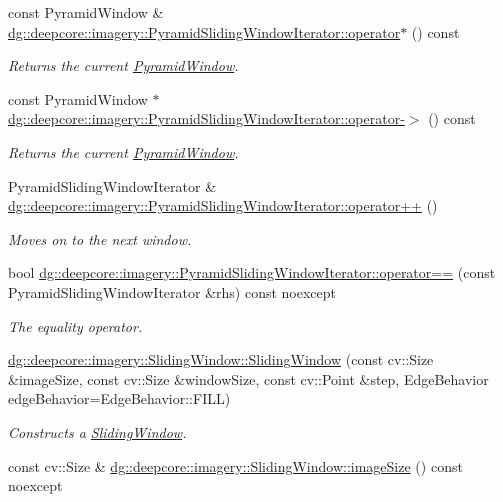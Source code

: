 \begin{DoxyCompactItemize}
const Pyramid\+Window \& \hyperlink{group___imagery_module_gaca9c2f2b709dbe324355c544933339ee}{dg\+::deepcore\+::imagery\+::\+Pyramid\+Sliding\+Window\+Iterator\+::operator$\ast$} () const 
\begin{DoxyCompactList}\small\item\em Returns the current \hyperlink{structdg_1_1deepcore_1_1imagery_1_1_pyramid_window}{Pyramid\+Window}. \end{DoxyCompactList}\item 
const Pyramid\+Window $\ast$ \hyperlink{group___imagery_module_gac54e72b4aa8c5b92bc491c12aed242d0}{dg\+::deepcore\+::imagery\+::\+Pyramid\+Sliding\+Window\+Iterator\+::operator-\/$>$} () const 
\begin{DoxyCompactList}\small\item\em Returns the current \hyperlink{structdg_1_1deepcore_1_1imagery_1_1_pyramid_window}{Pyramid\+Window}. \end{DoxyCompactList}\item 
Pyramid\+Sliding\+Window\+Iterator \& \hyperlink{group___imagery_module_gaa6990163252dcca167db1dde03c55100}{dg\+::deepcore\+::imagery\+::\+Pyramid\+Sliding\+Window\+Iterator\+::operator++} ()
\begin{DoxyCompactList}\small\item\em Moves on to the next window. \end{DoxyCompactList}\item 
bool \hyperlink{group___imagery_module_gaa1566b49b13ee8b98e58d748aba156b3}{dg\+::deepcore\+::imagery\+::\+Pyramid\+Sliding\+Window\+Iterator\+::operator==} (const Pyramid\+Sliding\+Window\+Iterator \&rhs) const noexcept
\begin{DoxyCompactList}\small\item\em The equality operator. \end{DoxyCompactList}\item 
\hyperlink{group___imagery_module_gaac77ef4c080960674fcf6c0c25960a1d}{dg\+::deepcore\+::imagery\+::\+Sliding\+Window\+::\+Sliding\+Window} (const cv\+::\+Size \&image\+Size, const cv\+::\+Size \&window\+Size, const cv\+::\+Point \&step, Edge\+Behavior edge\+Behavior=Edge\+Behavior\+::\+F\+I\+LL)
\begin{DoxyCompactList}\small\item\em Constructs a \hyperlink{classdg_1_1deepcore_1_1imagery_1_1_sliding_window}{Sliding\+Window}. \end{DoxyCompactList}\item 
const cv\+::\+Size \& \hyperlink{group___imagery_module_ga2771aea9a69cec6529758e6315bf2088}{dg\+::deepcore\+::imagery\+::\+Sliding\+Window\+::image\+Size} () const noexcept

\end{DoxyCompactItemize}

